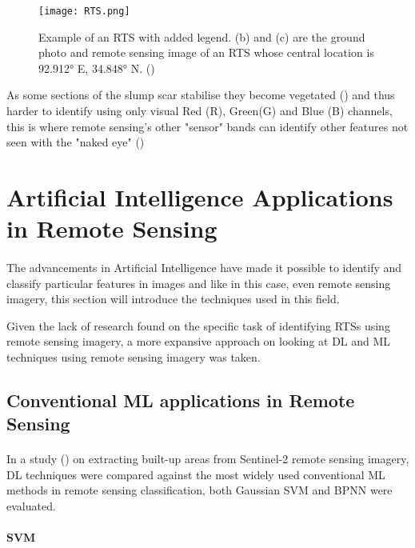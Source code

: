     \begin{figure}[hbt!]
        \centering
        \texttt{[image: RTS.png]}
        \caption{Example of an \gls{RTS} with added legend. (b) and (c) are the
ground photo and remote sensing image of an \gls{RTS} whose central location is 92.912° E, 34.848° N. (\cite{HUANG2020111534})}
        \label{fig_RTS}
    \end{figure}


As some sections of the slump scar stabilise they become vegetated (\cite{KOKELJ201556}) and thus harder to identify using only visual Red (R), Green(G) and Blue (B) channels, this is where remote sensing's other "sensor" bands can identify other features not seen with the "naked eye" (\cite{HUANG2020111534})
\section{Artificial Intelligence Applications in Remote Sensing}  \label{ai_rs}
\paragraph{}
The advancements in Artificial Intelligence have made it possible to identify and classify particular features in images and like in this case, even remote sensing imagery, this section will introduce the techniques used in this field.

Given the lack of research found on the specific task of identifying \gls{RTS}s using remote sensing imagery, a more expansive approach on looking at \gls{DL} and \gls{ML} techniques using remote sensing imagery was taken.

\subsection{Conventional \gls{ML} applications in Remote Sensing}  \label{ml_rs}
\paragraph{}
In a study (\cite{isprs-archives-XLII-3-79-2018}) on extracting built-up areas from Sentinel-2 remote sensing imagery, \gls{DL} techniques were compared against the most widely used conventional \gls{ML} methods in remote sensing classification, both Gaussian \gls{SVM} and \gls{BPNN} were evaluated.

\paragraph{\gls{SVM}}
